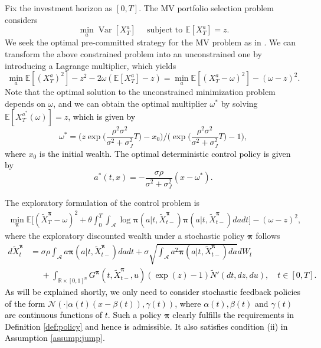 \documentclass[11pt]{article}
\newcommand{\1}{\mathbbm{1}}
\newcommand{\bpi}{\boldsymbol{\pi}}
\newcommand{\rev}[1]{\textcolor{black}{{#1}}} %
\begin{document}
Fix the investment horizon as $[0,T]$. The MV portfolio selection problem considers
\begin{equation}
	\min_{a}\operatorname{Var}\left[X_{T}^{a}\right]\quad \text { subject to } \mathbb{E}\left[X_{T}^{a}\right]=z.
\end{equation}
We seek the optimal pre-committed strategy for the MV problem as in \cite{zhou2000continuous}. We can transform the above constrained problem into an unconstrained one by introducing a Lagrange multiplier, which yields
\begin{equation}
	\min_{a} \mathbb{E}[(X_{T}^{a})^{2}]-z^{2}-2 \omega(\mathbb{E}[X_{T}^{a}]-z)=\min_{a} \mathbb{E}[(X_{T}^{a}-\omega)^{2}]-(\omega-z)^{2}.
	\label{eq:unconstrained}
\end{equation}
Note that the optimal solution to the unconstrained minimization problem depends on $\omega$, and we can obtain the optimal multiplier $\omega^*$ by solving $\mathbb{E}\left[X_{T}^{a^{*}}(\omega)\right]=z$, \rev{which is given by
\begin{equation}
	\omega^* = \bigg(z\exp\bigg(\frac{\rho^2\sigma^2}{\sigma^2+\sigma_J^2}T\bigg) - x_0\bigg)\bigg/\bigg(\exp\bigg(\frac{\rho^2\sigma^2}{\sigma^2+\sigma_J^2}T\bigg) -1\bigg), \label{eq:opt-Lagrange}
\end{equation}
where $x_0$ is the initial wealth. The optimal deterministic control policy is given by
\begin{equation}\label{eq:MV-port-opt-det-policy}
	a^*(t,x)=-\frac{\sigma\rho}{\sigma^2+\sigma_J^2}(x-\omega^*).
\end{equation}
}

The exploratory formulation of the control problem is
\begin{align} \label{eq:MV-expl}
	\min_{\bpi}\mathbb{E}\bigg[(\tilde{X}_{T}^{\bpi}-\omega)^{2} + \theta \int_0^T \int_{\mathcal{A}}\log \bpi(a|t, \tilde{X}_{t-}^{\bpi}) \bpi(a|t, \tilde{X}_{t-}^{\bpi})dadt \bigg]-(\omega-z)^{2},
\end{align}
where the exploratory discounted wealth under a stochastic policy $\bpi$ follows \rev{
\begin{align}
	d\tilde{X}^{\bpi}_t &= \sigma\rho \int_{\mathcal{A}}a\bpi(a|t, \tilde{X}^{\bpi}_{t-})da dt + \sigma\sqrt{\int_{\mathcal{A}}a^2\bpi(a|t, \tilde{X}^{\bpi}_{t-})da} dW_t\\
	& \phantom{=} + \int_{\mathbb{R}\times[0,1]^n} G^{\bpi}(t,\tilde{X}^{\bpi}_{t-},u)(\exp(z)-1)\widetilde N'(dt, dz, du),\quad t\in[0,T].\label{eq:wealth-expl}
\end{align}
As will be explained shortly, we only need to consider stochastic feedback policies of the form $\mathcal{N}(\cdot|\alpha(t)(x-\beta(t)),\gamma(t))$, where $\alpha(t), \beta(t)$ and $\gamma(t)$ are continuous functions of $t$. Such a policy $\bpi$ clearly fulfills the requirements in Definition \ref{def:policy} and hence is admissible. It also satisfies condition (ii) in Assumption \ref{assump:jump}. }
\end{document}
